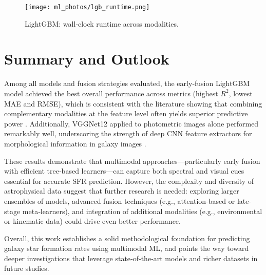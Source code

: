 \documentclass[english,bachelor,oneside]{ctufit-thesis}
\begin{document}
\begin{figure}[H]
  \centering
  \texttt{[image: ml\_photos/lgb\_runtime.png]}
  \caption{LightGBM: wall‐clock runtime across modalities.}
  \label{fig:lgb_runtime}
\end{figure}

\section{Summary and Outlook}
Among all models and fusion strategies evaluated, the early‐fusion LightGBM model achieved the best overall performance across metrics (highest $R^2$, lowest MAE and RMSE), which is consistent with the literature showing that combining complementary modalities at the feature level often yields superior predictive power \cite{zhao2024deep}. Additionally, VGGNet12 applied to photometric images alone performed remarkably well, underscoring the strength of deep CNN feature extractors for morphological information in galaxy images \cite{dieleman2015rotation}. 

These results demonstrate that multimodal approaches—particularly early fusion with efficient tree‐based learners—can capture both spectral and visual cues essential for accurate SFR prediction. However, the complexity and diversity of astrophysical data suggest that further research is needed: exploring larger ensembles of models, advanced fusion techniques (e.g., attention‐based or late‐stage meta‐learners), and integration of additional modalities (e.g., environmental or kinematic data) could drive even better performance. 

Overall, this work establishes a solid methodological foundation for predicting galaxy star formation rates using multimodal ML, and points the way toward deeper investigations that leverage state‐of‐the‐art models and richer datasets in future studies.


\backmatter

\printbibliography
\end{document}
